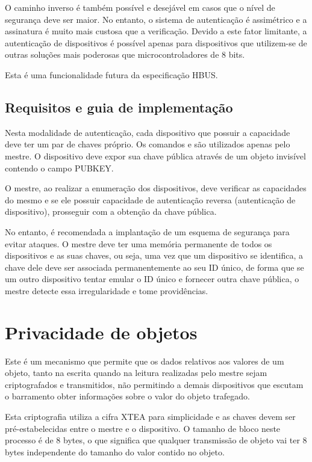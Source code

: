 O caminho inverso é também possível e desejável em casos que o nível de segurança deve ser maior. No entanto, o sistema de autenticação é assimétrico e a assinatura é muito mais custosa que a verificação. Devido a este fator limitante, a autenticação de dispositivos é possível apenas para dispositivos que utilizem-se de outras soluções mais poderosas que microcontroladores de 8 bits.

Esta é uma funcionalidade futura da especificação HBUS.

\subsection{Requisitos e guia de implementação}

Nesta modalidade de autenticação, cada dispositivo que possuir a capacidade deve ter um par de chaves próprio. Os comandos  e  são utilizados apenas pelo mestre. O dispositivo deve expor sua chave pública através de um objeto invisível contendo o campo PUBKEY.

O mestre, ao realizar a enumeração dos dispositivos, deve verificar as capacidades do mesmo e se ele possuir capacidade de autenticação reversa (autenticação de dispositivo), prosseguir com a obtenção da chave pública.

No entanto, é recomendada a implantação de um esquema de segurança para evitar ataques. O mestre deve ter uma memória permanente de todos os dispositivos e as suas chaves, ou seja, uma vez que um dispositivo se identifica, a chave dele deve ser associada permanentemente ao seu ID único, de forma que se um outro dispositivo tentar emular o ID único e fornecer outra chave pública, o mestre detecte essa irregularidade e tome providências.

\section{Privacidade de objetos}

Este é um mecanismo que permite que os dados relativos aos valores de um objeto, tanto na escrita quando na leitura realizadas pelo mestre sejam criptografados e transmitidos, não permitindo a demais dispositivos que escutam o barramento obter informações sobre o valor do objeto trafegado.

Esta criptografia utiliza a cifra XTEA para simplicidade e as chaves devem ser pré-estabelecidas entre o mestre e o dispositivo. O tamanho de bloco neste processo é de 8 bytes, o que significa que qualquer transmissão de objeto vai ter 8 bytes independente do tamanho do valor contido no objeto.

